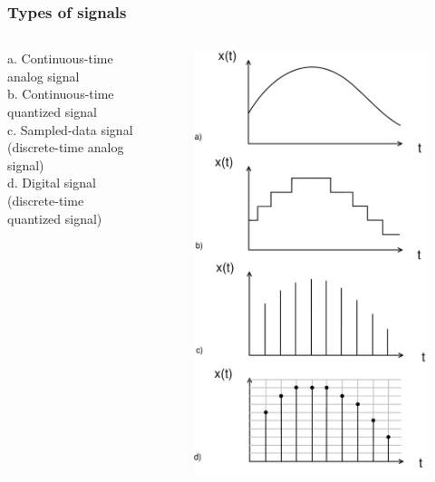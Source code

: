 \begin{frame}
	\frametitle{Types of signals}
	\begin{columns}
		\vspace{-10ex}
		a. Continuous-time analog signal\\
		\medskip
		b. Continuous-time quantized signal\\
		\medskip
		c. Sampled-data signal (discrete-time analog signal)\\
		\medskip
		d. Digital signal (discrete-time quantized signal)
		\vspace{-2ex}
		\begin{figure}
			\includegraphics[width=0.8\linewidth]{types}
		\end{figure}
	\end{columns}
\end{frame}

